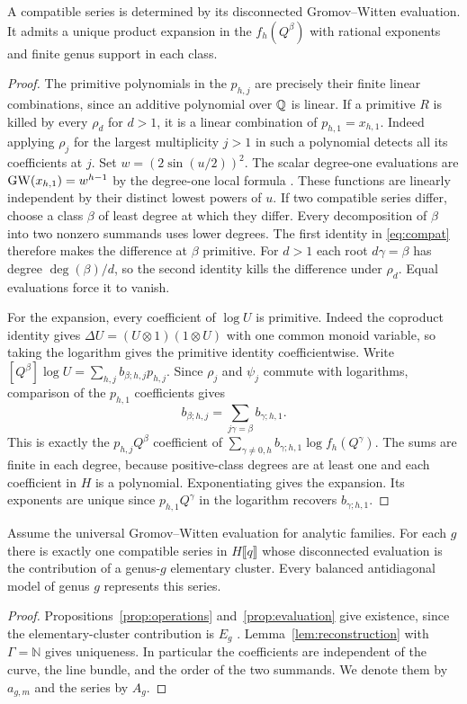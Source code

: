 \begin{lemma}\label{lem:reconstruction}
A compatible series is determined by its disconnected
Gromov--Witten evaluation. It admits a unique product expansion
in the $f_h(Q^\beta)$ with rational exponents and finite genus
support in each class.
\end{lemma}
\begin{proof}
The primitive polynomials in the $p_{h,j}$ are precisely their
finite linear combinations, since an additive polynomial over
$\mathbb Q$ is linear. If a primitive $R$ is killed by every $\rho_d$
for $d>1$, it is a linear combination of $p_{h,1}=x_{h,1}$.
Indeed applying $\rho_j$ for the largest multiplicity $j>1$ in
such a polynomial detects all its coefficients at $j$. Set
$w=(2\sin(u/2))^2$. The scalar degree-one evaluations are
$\operatorname{GW}(x_{h,1})=w^{h-1}$ by the degree-one local formula
\cite[\S8]{BP}. These functions are linearly independent by their
distinct lowest powers of $u$. If two compatible series differ,
choose a class $\beta$ of least degree at which they differ.
Every decomposition of $\beta$ into two nonzero summands uses
lower degrees. The first identity in \eqref{eq:compat} therefore
makes the difference at $\beta$ primitive. For $d>1$ each root
$d\gamma=\beta$ has degree $\deg(\beta)/d$, so the second identity
kills the difference under $\rho_d$. Equal evaluations force it
to vanish.

For the expansion, every coefficient of $\log U$ is primitive.
Indeed the coproduct identity gives $\Delta U=(U\otimes1)(1\otimes U)$
with one common monoid variable, so taking the logarithm gives the
primitive identity coefficientwise. Write
$[Q^\beta]\log U=\sum_{h,j}b_{\beta;h,j}p_{h,j}$. Since $\rho_j$
and $\psi_j$ commute with logarithms, comparison of the $p_{h,1}$
coefficients gives
\[
 b_{\beta;h,j}=\sum_{j\gamma=\beta} b_{\gamma;h,1}.
\]
This is exactly the $p_{h,j}Q^\beta$ coefficient of
$\sum_{\gamma\ne0,h}b_{\gamma;h,1}\log f_h(Q^\gamma)$.
The sums are finite in each degree, because positive-class degrees
are at least one and each coefficient in $H$ is a polynomial.
Exponentiating gives the expansion. Its exponents are unique since
$p_{h,1}Q^\gamma$ in the logarithm recovers $b_{\gamma;h,1}$.
\end{proof}

\begin{corollary}\label{cor:characterization}
Assume the universal Gromov--Witten evaluation for analytic families.
For each $g$ there is exactly one compatible series in $H\llbracket q\rrbracket$
whose disconnected evaluation is the contribution of a genus-$g$
elementary cluster. Every balanced antidiagonal model of genus $g$
represents this series.
\end{corollary}
\begin{proof}
Propositions~\ref{prop:operations} and~\ref{prop:evaluation} give
existence, since the elementary-cluster contribution is $E_g$
\cite[Proposition~3.3]{IP}. Lemma~\ref{lem:reconstruction} with
$\Gamma=\mathbb N$ gives uniqueness. In particular the coefficients
are independent of the curve, the line bundle, and the order of
the two summands. We denote them by $a_{g,m}$ and the series by $A_g$.
\end{proof}
